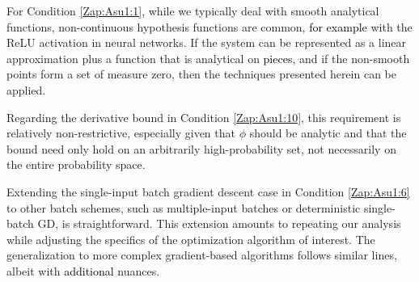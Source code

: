 \documentclass{article} %
\begin{document}
For Condition \ref{Zap:Asu1:1}, while we typically deal with smooth analytical functions, non-continuous hypothesis functions are common, \textcolor{black}{for example} with the ReLU activation in neural networks. If the system can be represented as a linear approximation plus a function that is analytical on \textcolor{black}{pieces}, and if the non-smooth points form a set of measure zero, then the techniques presented herein can be applied.

Regarding the derivative bound in Condition \ref{Zap:Asu1:10}, this requirement is relatively non-restrictive, especially given that \(\phi\) should be analytic and that the bound need only hold on an arbitrarily high-probability set, not necessarily on the entire probability space.

Extending the single-input batch gradient descent case in Condition \ref{Zap:Asu1:6} to other batch schemes, such as multiple-input batches or deterministic single-batch GD, is straightforward. This extension amounts to repeating our analysis while adjusting the specifics of the optimization algorithm of interest. The generalization to more complex gradient-based algorithms follows similar lines, albeit with \textcolor{black}{additional} nuances.
\end{document}
